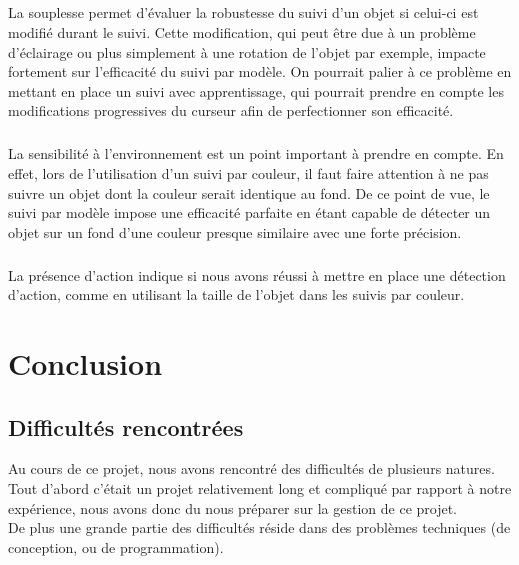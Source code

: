 \documentclass{report}
\begin{document}
			\paragraph{}
			La souplesse permet d'évaluer la robustesse du suivi d'un objet si celui-ci est modifié durant le suivi. Cette modification, qui peut être due à un problème d'éclairage ou plus simplement à une rotation de l'objet par exemple, impacte fortement sur l'efficacité du suivi par modèle. On pourrait palier à ce problème en mettant en place un suivi avec apprentissage, qui pourrait prendre en compte les modifications progressives du curseur afin de perfectionner son efficacité.
			\paragraph{}
			La sensibilité à l'environnement est un point important à prendre en compte. En effet, lors de l'utilisation d'un suivi par couleur, il faut faire attention à ne pas suivre un objet dont la couleur serait identique au fond. De ce point de vue, le suivi par modèle impose une efficacité parfaite en étant capable de détecter un objet sur un fond d'une couleur presque similaire avec une forte précision.
			\paragraph{}
			La présence d'action indique si nous avons réussi à mettre en place une détection d'action, comme en utilisant la taille de l'objet dans les suivis par couleur.
	\chapter{Conclusion}
		\section{Difficultés rencontrées}
		Au cours de ce projet, nous avons rencontré des difficultés de plusieurs natures. Tout d'abord c'était un projet relativement long et compliqué par rapport à notre expérience, nous avons donc du nous préparer sur la gestion de ce projet. \\
		De plus une grande partie des difficultés réside dans des problèmes techniques (de conception, ou de programmation). \\
		
\end{document}
